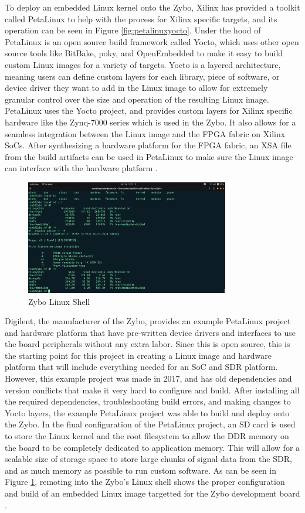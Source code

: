 \documentclass[conference]{IEEEtran}
\begin{document}
To deploy an embedded Linux kernel onto the Zybo, Xilinx has provided a toolkit called PetaLinux to help with the process for Xilinx specific targets, and its operation can be seen in Figure \ref{fig:petalinuxyocto}. Under the hood of PetaLinux is an open source build framework called Yocto, which uses other open source tools like BitBake, poky, and OpenEmbedded
to make it easy to build custom Linux images for a variety of targets. Yocto is a layered architecture, meaning users can define custom layers for each
library, piece of software, or device driver they want to add in the Linux image to allow for extremely granular control over the size and operation of the resulting Linux image. PetaLinux uses the Yocto project, and provides custom layers for Xilinx specific hardware like the Zynq-7000 series which is used in the Zybo. It also allows for a seamless integration between the Linux image and the FPGA fabric on Xilinx SoCs. After synthesizing a hardware platform for the FPGA fabric, an XSA file from the build artifacts can be used in PetaLinux to make sure the Linux image can interface with the hardware platform \cite{amd_petalinux_ug1144}.

\begin{figure}[htbp]
  \centering
  \includegraphics[width=3.5in]{images/linuxshell.png} %
  \caption{Zybo Linux Shell}
  \label{fig:linuxshell}
\end{figure}

Digilent, the manufacturer of the Zybo, provides an example PetaLinux project and hardware platform that have pre-written device drivers and interfaces to use the board peripherals without any extra labor. Since this is open source, this is the starting point for this project in creating a Linux image and hardware platform that will include everything needed for an SoC and SDR platform. However, this example project was made in 2017, and has old dependencies and version conflicts that make it very hard to configure and build. After installing all the required dependencies, troubleshooting build errors, and making changes to Yocto layers, the example PetaLinux project was able to build and deploy onto the Zybo. In the final configuration of the PetaLinux project, an SD card is used to store the Linux kernel and the root filesystem to allow the DDR memory on the board to be completely dedicated to application memory. This will allow for a scalable size of storage space to store large chunks of signal data from the SDR, and as much memory as possible to run custom software. As can be seen in Figure \ref{fig:linuxshell}, remoting into the Zybo's Linux shell shows the proper configuration and build of an embedded Linux image targetted for the Zybo development board \cite{digilent_petalinux_zybo}.
\end{document}
